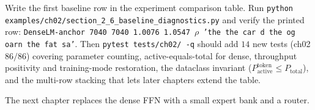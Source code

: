 \begin{checkpointbox}
Write the first baseline row in the experiment comparison table. Run \texttt{python examples/ch02/section\_2\_6\_baseline\_diagnostics.py} and verify the printed row: \texttt{DenseLM-anchor    7040    7040    1.0076  1.0547   $\rho$   'the the car d the og oarn the fat sa'}. Then \texttt{pytest tests/ch02/ -q} should add $14$ new tests (ch02 $86/86$) covering parameter counting, active-equals-total for dense, throughput positivity and training-mode restoration, the dataclass invariant ($P^{\text{token}}_{\text{active}} \le P_{\text{total}}$), and the multi-row stacking that lets later chapters extend the table.
\end{checkpointbox}

The next chapter replaces the dense FFN with a small expert bank and a router.

